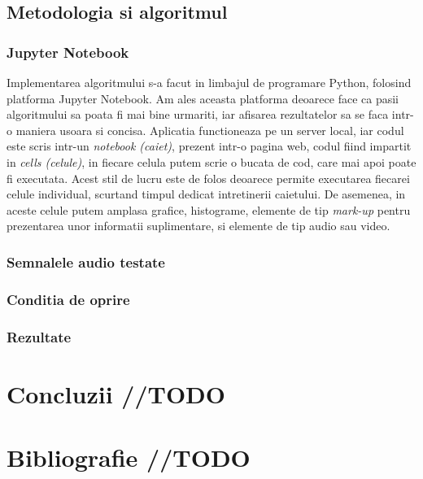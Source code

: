\documentclass[12pt]{article}
\begin{document}
\subsection{Metodologia si algoritmul}
\subsubsection{Jupyter Notebook}
Implementarea algoritmului s-a facut in limbajul de programare Python, folosind platforma Jupyter Notebook. Am ales aceasta platforma deoarece face ca pasii algoritmului sa poata fi mai bine urmariti, iar afisarea rezultatelor sa se faca intr-o maniera usoara si concisa. Aplicatia functioneaza pe un server local, iar codul este scris intr-un \textit{notebook (caiet)}, prezent intr-o pagina web, codul fiind impartit in \textit{cells (celule)}, in fiecare celula putem scrie o bucata de cod, care mai apoi poate fi executata. Acest stil de lucru este de folos deoarece permite executarea fiecarei celule individual, scurtand timpul dedicat intretinerii caietului. De asemenea, in aceste celule putem amplasa grafice, histograme, elemente de tip \textit{mark-up} pentru prezentarea unor informatii suplimentare, si elemente de tip audio sau video. 

\subsubsection{Semnalele audio testate}

\subsubsection{Conditia de oprire}

\subsubsection{Rezultate}

\newpage
\section{Concluzii //TODO}
\section{Bibliografie //TODO}



\newpage
\cite{paltanea}
\newpage
\end{document}
